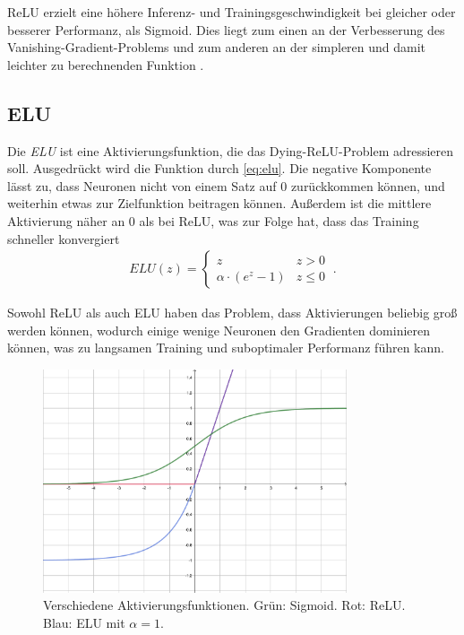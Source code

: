 \ac{ReLU} erzielt eine höhere Inferenz- und Trainingsgeschwindigkeit bei gleicher oder besserer Performanz, 
als Sigmoid. Dies liegt zum einen an der Verbesserung des Vanishing-Gradient-Problems und zum anderen an der 
simpleren und damit leichter zu berechnenden Funktion \cite[S.~226]{Goodfellow.2016}.

\subsection{\acf{ELU}}

Die \textit{\acf{ELU}} ist eine Aktivierungsfunktion, die das Dying-\ac{ReLU}-Problem adressieren soll. 
Ausgedrückt wird die Funktion durch \autoref{eq:elu}. Die negative Komponente lässt zu, dass Neuronen nicht 
von einem Satz auf $0$ zurückkommen können, und weiterhin etwas zur Zielfunktion beitragen können. Außerdem ist die mittlere 
Aktivierung näher an $0$ als bei \ac{ReLU}, was zur Folge hat, dass das Training schneller konvergiert \cite{Clevert.23112015}
\begin{align}
	\label{eq:elu} ELU(z) = \begin{cases} 
		z & z > 0 \\
		\alpha \cdot (e^z - 1) & z \leq 0 
	\end{cases} ~.
\end{align}

Sowohl \ac{ReLU} als auch \ac{ELU} haben das Problem, dass Aktivierungen beliebig groß werden können, 
wodurch einige wenige Neuronen den Gradienten dominieren können, was zu langsamen Training und suboptimaler Performanz führen kann. 
\begin{figure}
	\centering
	\includegraphics[width=0.8\textwidth]{Bilder/activation-geogebra-export.pdf} 
	\caption{Verschiedene Aktivierungsfunktionen. Grün: Sigmoid. Rot: \ac{ReLU}. Blau: \ac{ELU} mit $\alpha = 1$.}
	\label{fig:activation}
\end{figure} 


